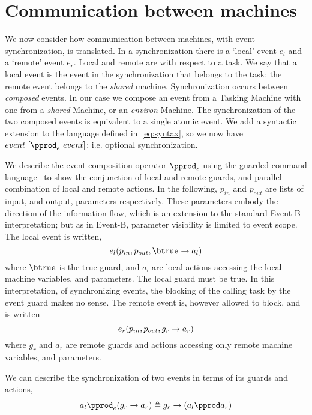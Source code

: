 \section{Communication between machines}\label{synching}
We now consider how communication between machines, with event synchronization, is translated. In a synchronization there is a ‘local’ event $e_l$ and a ‘remote’ event $e_r$. Local and remote are with respect to a task. We say that a local event is the event in the synchronization that belongs to the task; the remote event belongs to the \emph{shared} machine. Synchronization occurs between  \emph{composed} events. In our case we compose an event from a Tasking Machine with one from a \emph{shared} Machine, or an \emph{environ} Machine. The synchronization of the two composed events is equivalent to a single atomic event. We add a syntactic extension to the language defined in~\ref{eq:syntax}, so we now have $event~[\pprod_e~event]$: i.e. optional synchronization. 


We describe the event composition operator $\pprod_e$ using the guarded command language~\cite{Dijkstra75a} to show the conjunction of local and remote guards, and parallel combination of local and remote actions. In the following, $p_{in}$ and $p_{out}$ are lists of input, and output, parameters respectively. These parameters embody the direction of the information flow, which is an extension to the standard Event-B interpretation; but as in Event-B, parameter visibility is limited to event scope. The local event is written,
%
\begin{equation}
e_l(p_{in}, p_{out}, \btrue \rightarrow a_l)
\notag
\end{equation}
%
 where $\btrue$ is the true guard, and $a_l$ are local actions accessing the local machine variables, and parameters. The local guard must be true. In this interpretation, of synchronizing events, the blocking of the calling task by the event guard makes no sense. The remote event is, however allowed to block, and is written
%
\begin{equation}
e_r(p_{in}, p_{out}, g_r \rightarrow a_r)
\notag
\end{equation}
%
 where $g_r$ and $a_r$ are remote guards and actions accessing only remote machine variables, and parameters.

We can describe the synchronization of two events in terms of its guards and actions,  
%
\begin{equation}
a_l \pprod_e (g_r \rightarrow a_r) \triangleq g_r \rightarrow (a_l \pprod a_r)
\notag
\end{equation}
%

